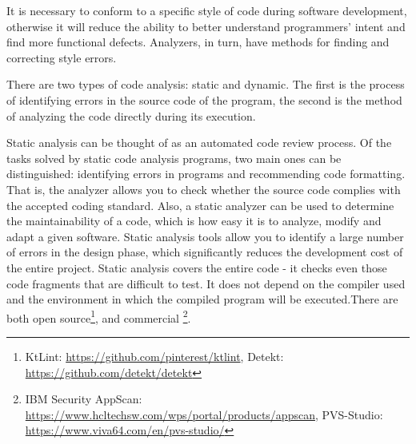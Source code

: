 It is necessary to conform to a specific style of code during software development, otherwise it will reduce the ability to better understand programmers’ intent and ﬁnd more functional defects. Analyzers, in turn, have methods for finding and correcting style errors. 

There are two types of code analysis: static and dynamic. The first is the process of identifying errors in the source code of the program, the second is the method of analyzing the code directly during its execution.

Static analysis can be thought of as an automated code review process. Of the tasks solved by static code analysis programs, two main ones can be distinguished: identifying errors in programs and recommending code formatting. That is, the analyzer allows you to check whether the source code complies with the accepted coding standard. Also, a static analyzer can be used to determine the maintainability of a code, which is how easy it is to analyze, modify and adapt a given software. Static analysis tools allow you to identify a large number of errors in the design phase, which significantly reduces the development cost of the entire project. Static analysis covers the entire code - it checks even those code fragments that are difficult to test. It does not depend on the compiler used and the environment in which the compiled program will be executed.There are both open source\footnote{KtLint: \url{https://github.com/pinterest/ktlint}, Detekt: \url{https://github.com/detekt/detekt}}, 
and commercial \footnote{IBM Security AppScan: \url{https://www.hcltechsw.com/wps/portal/products/appscan}, PVS-Studio: \url{https://www.viva64.com/en/pvs-studio/}}.
